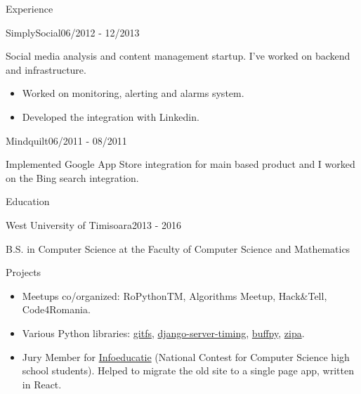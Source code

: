 \documentclass{resume}
\begin{document}
\begin{rSection}{Experience}
    \begin{rSubsection}{SimplySocial}{06/2012 - 12/2013}{}{}
        \item Social media analysis and content management startup. I’ve worked on backend and infrastructure.
        \begin{itemize}
            \setlength\itemsep{-0.3em}
            \item Worked on monitoring, alerting and alarms system.
            \item Developed the integration with Linkedin.
        \end{itemize}
    \end{rSubsection}

    \begin{rSubsection}{Mindquilt}{06/2011 - 08/2011}{}{}
        \item Implemented Google App Store integration for main based product and I worked on the Bing search integration.
    \end{rSubsection}

\end{rSection}

\begin{rSection}{Education}
    \begin{rSubsection}{West University of Timisoara}{2013 - 2016}{}{}
    \item B.S. in Computer Science at the Faculty of Computer Science and Mathematics
    \end{rSubsection}
\end{rSection}

\begin{rSection}{Projects}
    \begin{itemize}
       \setlength\itemsep{-0.3em}
       \item Meetups co/organized: RoPythonTM, Algorithms Meetup, Hack\&Tell, Code4Romania.
       \item Various Python libraries: \href{https://github.com/presslabs/gitfs}{gitfs}, \href{https://github.com/vtemian/django-server-timing}{django-server-timing}, \href{https://github.com/vtemian/buffpy}{buffpy}, \href{https://github.com/presslabs/zipa}{zipa}.
       \item Jury Member for \href{https://infoeducatie.ro}{Infoeducatie} (National Contest for Computer Science high school students). Helped to migrate the old site to a single page app, written in React.
    \end{itemize}
\end{rSection}
\end{document}
